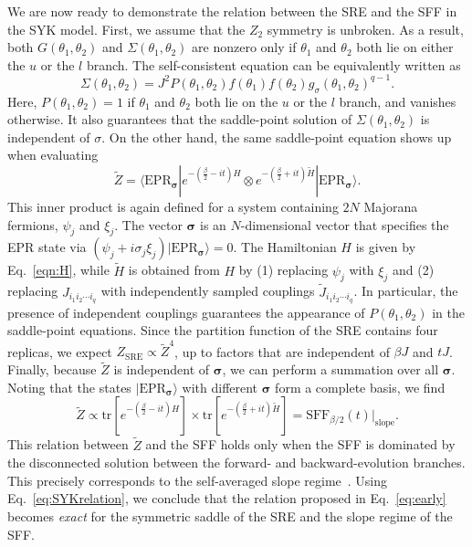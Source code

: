 \documentclass[aps,prl,twocolumn,superscriptaddress,longbibliography]{revtex4-2}
\begin{document}
   We are now ready to demonstrate the relation between the SRE and the SFF in the SYK model. First, we assume that the $Z_2$ symmetry is unbroken. As a result, both $G(\theta_1,\theta_2)$ and $\Sigma(\theta_1,\theta_2)$ are nonzero only if $\theta_1$ and $\theta_2$ both lie on either the $u$ or the $l$ branch. The self-consistent equation can be equivalently written as
   \begin{equation}
   \Sigma(\theta_1,\theta_2)=J^2P(\theta_1,\theta_2)f(\theta_1)f(\theta_2)g_\sigma(\theta_1,\theta_2)^{q-1}.
   \end{equation}
   Here, $P(\theta_1,\theta_2)=1$ if $\theta_1$ and $\theta_2$ both lie on the $u$ or the $l$ branch, and vanishes otherwise. It also guarantees that the saddle-point solution of $\Sigma(\theta_1,\theta_2)$ is independent of $\sigma$. On the other hand, the same saddle-point equation shows up when evaluating
   \begin{equation}
   \tilde{Z}=\langle \text{EPR}_{\bm{\sigma}}|e^{-(\frac{\beta}{2}-it) H}\otimes e^{-(\frac{\beta}{2}+it) \tilde{H}}|\text{EPR}_{\bm{\sigma}}\rangle.
   \end{equation}
   This inner product is again defined for a system containing $2N$ Majorana fermions, $\psi_j$ and $\xi_j$. The vector $\bm{\sigma}$ is an $N$-dimensional vector that specifies the EPR state via $(\psi_j + i \sigma_j \xi_j)\lvert \mathrm{EPR}_{\bm{\sigma}} \rangle = 0$. The Hamiltonian $H$ is given by Eq.~\eqref{eqn:H}, while $\tilde{H}$ is obtained from $H$ by (1) replacing $\psi_j$ with $\xi_j$ and (2) replacing $J_{i_1 i_2 \cdots i_q}$ with independently sampled couplings $\tilde{J}_{i_1 i_2 \cdots i_q}$. In particular, the presence of independent couplings guarantees the appearance of $P(\theta_1,\theta_2)$ in the saddle-point equations. Since the partition function of the SRE contains four replicas, we expect $Z_{\text{SRE}} \propto \tilde{Z}^4$, up to factors that are independent of $\beta J$ and $tJ$. Finally, because $\tilde{Z}$ is independent of $\bm{\sigma}$, we can perform a summation over all $\bm{\sigma}$. Noting that the states $\lvert \mathrm{EPR}_{\bm{\sigma}} \rangle$ with different $\bm{\sigma}$ form a complete basis, we find
   \begin{equation}\label{eq:SYKrelation}
   \tilde{Z}\propto\text{tr}\left[e^{-(\frac{\beta}{2}-it) H}\right]\times \text{tr}\left[e^{-(\frac{\beta}{2}+it) \tilde{H}}\right]=\text{SFF}_{{\beta}/{2}}(t)\Big|_{\text{slope}}.
   \end{equation}
   This relation between $\tilde{Z}$ and the SFF holds only when the SFF is dominated by the disconnected solution between the forward- and backward-evolution branches. This precisely corresponds to the self-averaged slope regime~\cite{Saad:2018bqo}. Using Eq.~\eqref{eq:SYKrelation}, we conclude that the relation proposed in Eq.~\eqref{eq:early} becomes \textit{exact} for the symmetric saddle of the SRE and the slope regime of the SFF.
\end{document}
